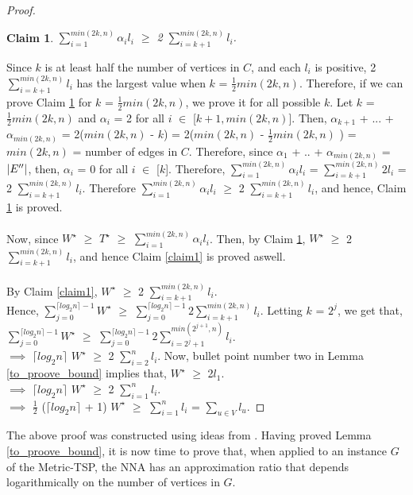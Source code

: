 \documentclass{article}
\newtheorem{claim}{Claim}
\begin{document}
\begin{proof}
\begin{claim}
\label{claim2}
$\sum_{i =1}^{min(2k, n)} \alpha_i l_i$ $\geq$ 2 $\sum_{i = k + 1}^{min(2k, n)} l_i$.
\end{claim}
Since $k$ is at least half the number of vertices in $C$, and each $l_i$ is positive, 2 $\sum_{i = k + 1}^{min(2k, n)} l_i$ has the largest value when $k$ = $\frac{1}{2} min(2k, n)$. Therefore, if we can prove Claim \ref{claim2} for $k$ = $\frac{1}{2} min(2k, n)$, we prove it for all possible $k$. Let $k$ = $\frac{1}{2} min(2k, n)$ and $\alpha_i$ = 2 for all $i$ $\in$ [$k+1,min(2k, n)$]. Then, $\alpha_{k+1}$ + ... + $\alpha_{min(2k, n)}$ = 2($min(2k, n)$ - $k$) = 2($min(2k, n)$ -  $\frac{1}{2} min(2k, n)$ ) =  $min(2k, n)$ = number of edges in $C$. Therefore, since $\alpha_1$ + .. + $\alpha_{min(2k, n)}$ = $\abs{E^{\prime\prime}}$, then, $\alpha_i$ = 0 for all $i$ $\in$ [$k$]. Therefore, $\sum_{i =1}^{min(2k, n)} \alpha_i l_i$ = $\sum_{i = k + 1}^{min(2k, n)}2 l_i$ = 2 $\sum_{i = k + 1}^{min(2k, n)} l_i$. Therefore $\sum_{i =1}^{min(2k, n)} \alpha_i l_i$ $\geq$ 2 $\sum_{i = k + 1}^{min(2k, n)} l_i$, and hence, Claim \ref{claim2} is proved.\\\\
Now, since $W^\star$ $\geq$ $T^\star$ $\geq$ $\sum_{i =1}^{min(2k, n)} \alpha_i l_i$. Then, by Claim \ref{claim2}, $W^\star$  $\geq$ 2 $\sum_{i = k + 1}^{min(2k, n)} l_i$, and hence Claim \ref{claim1} is proved aswell.\\\\
By Claim \ref{claim1},  $W^\star$  $\geq$ 2 $\sum_{i = k + 1}^{min(2k, n)} l_i$. \\Hence,  $\sum_{j = 0}^{\lceil log_2 n \rceil - 1} W^\star$  $\geq$ $\sum_{j = 0}^{\lceil log_2 n \rceil -1} 2 \sum_{i = k + 1}^{min(2k, n)} l_i$. Letting $k$ = $2^{j}$, we get that,  $\sum_{j = 0}^{\lceil log_2 n \rceil - 1} W^\star$  $\geq$ $\sum_{j = 0}^{\lceil log_2 n \rceil -1} 2 \sum_{i = 2^j + 1}^{min(2^{j+1}, n)} l_i$. \\$\implies$ $\lceil log_2 n \rceil$ $W^\star$  $\geq$ 2 $\sum_{i = 2}^{n} l_i$. Now, bullet point number two in Lemma \ref{to_proove_bound} implies that, $W^\star$ $\geq$ 2$l_1$. \\$\implies$ $\lceil log_2 n \rceil$ $W^\star$  $\geq$ 2 $\sum_{i = 1}^{n} l_i$.\\$\implies$  $\frac{1}{2}$ ($\lceil log_2 n \rceil$ + 1) $W^\star$  $\geq$ $\sum_{i = 1}^{n} l_i$ = $\sum_{u \in V} l_u$.
\end{proof}
The above proof was constructed using ideas from \cite{Rosenkrantz}. Having proved Lemma \ref{to_proove_bound}, it is now time to prove that, when applied to an instance $G$ of the Metric-TSP, the NNA has an approximation ratio that depends logarithmically on the number of vertices in $G$.
\end{document}
